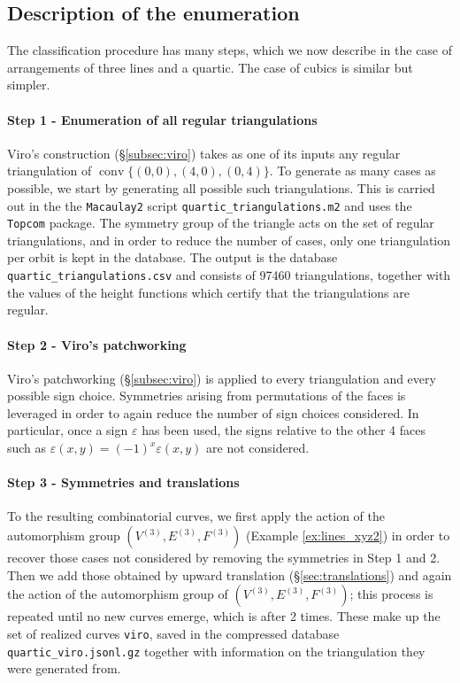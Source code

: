 \documentclass[11pt,reqno]{amsart}
\theoremstyle{plain}
\theoremstyle{definition}
\theoremstyle{remark}
\numberwithin{equation}{subsection}
\DeclareMathOperator{\conv}{conv}
\begin{document}
\subsection{Description of the enumeration}

The classification procedure has many steps, which we now describe in the case of arrangements of three lines and a quartic. The case of cubics is similar but simpler.

\paragraph{\textbf{Step 1 - Enumeration of all regular triangulations}} Viro's construction (§\ref{subsec:viro}) takes as one of its inputs any regular triangulation of $\conv\{(0,0),(4,0),(0,4)\}$. To generate as many cases as possible, we start by generating all possible such triangulations. This is carried out in the the \texttt{Macaulay2} \cite{M2} script \texttt{quartic\_triangulations.m2} and uses the \texttt{Topcom} \cite{TopcomSource} package. The symmetry group of the triangle acts on the set of regular triangulations, and in order to reduce the number of cases, only one triangulation per orbit is kept in the database. The output is the database \texttt{quartic\_triangulations.csv} and consists of 97460 triangulations, together with the values of the height functions which certify that the triangulations are regular.

\paragraph{\textbf{Step 2 - Viro's patchworking}} Viro's patchworking (§\ref{subsec:viro}) is applied to every triangulation and every possible sign choice. Symmetries arising from permutations of the faces is leveraged in order to again reduce the number of sign choices considered. In particular, once a sign $\varepsilon$ has been used, the signs relative to the other 4 faces such as $\varepsilon(x,y)=(-1)^{x}\varepsilon(x,y)$ are not considered.

\paragraph{\textbf{Step 3 - Symmetries and translations}} To the resulting combinatorial curves, we first apply the action of the automorphism group $(V^{(3)},E^{(3)},F^{(3)})$ (Example \ref{ex:lines_xyz2}) in order to recover those cases not considered by removing the symmetries in Step 1 and 2. Then we add those obtained by upward translation (§\ref{sec:translations}) and again the action of the automorphism group of $(V^{(3)},E^{(3)},F^{(3)})$; this process is repeated until no new curves emerge, which is after 2 times. These make up the set of realized curves \texttt{viro}, saved in the compressed database \texttt{quartic\_viro.jsonl.gz} together with information on the triangulation they were generated from.
\end{document}
